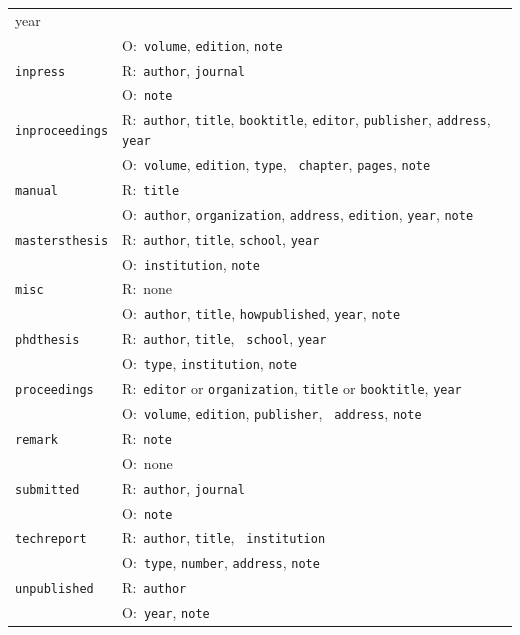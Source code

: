 \documentclass{article}
\begin{document}
\begin{tabular}{|ll|}
{year} \\ 
& \textsf{O:}~\texttt{volume}, \texttt{edition}, \texttt{note} \\ \hline
\texttt{inpress} & \textsf{R:}~\texttt{author}, \texttt{journal} \\ 
& \textsf{O:}~\texttt{note} \\ \hline
\texttt{inproceedings} & \textsf{R:}~\texttt{author}, \texttt{title}, 
\texttt{booktitle}, \texttt{editor}, \texttt{publisher}, \texttt{address}, 
\texttt{year} \\ 
& \textsf{O:}~\texttt{volume}, \texttt{edition}, \texttt{type}, \texttt{%
chapter}, \texttt{pages}, \texttt{note} \\ \hline
\texttt{manual} & \textsf{R:}~\texttt{title} \\ 
& \textsf{O:}~\texttt{author}, \texttt{organization}, \texttt{address}, 
\texttt{edition}, \texttt{year}, \texttt{note} \\ \hline
\texttt{mastersthesis} & \textsf{R:}~\texttt{author}, \texttt{title}, 
\texttt{school}, \texttt{year} \\ 
& \textsf{O:}~\texttt{institution}, \texttt{note} \\ \hline
\texttt{misc} & \textsf{R:}~none \\ 
& \textsf{O:}~\texttt{author}, \texttt{title}, \texttt{howpublished}, 
\texttt{year}, \texttt{note} \\ \hline
\texttt{phdthesis} & \textsf{R:}~\texttt{author}, \texttt{title}, \texttt{%
school}, \texttt{year} \\ 
& \textsf{O:}~\texttt{type}, \texttt{institution}, \texttt{note} \\ \hline
\texttt{proceedings} & \textsf{R:}~\texttt{editor} or \texttt{organization}, 
\texttt{title} or \texttt{booktitle}, \texttt{year} \\ 
& \textsf{O:}~\texttt{volume}, \texttt{edition}, \texttt{publisher}, \texttt{%
address}, \texttt{note} \\ \hline
\texttt{remark} & \textsf{R:}~\texttt{note} \\ 
& \textsf{O:}~none \\ \hline
\texttt{submitted} & \textsf{R:}~\texttt{author}, \texttt{journal} \\ 
& \textsf{O:}~\texttt{note} \\ \hline
\texttt{techreport} & \textsf{R:}~\texttt{author}, \texttt{title}, \texttt{%
institution} \\ 
& \textsf{O:}~\texttt{type}, \texttt{number}, \texttt{address}, \texttt{note}
\\ \hline
\texttt{unpublished} & \textsf{R:}~\texttt{author } \\ 
& \textsf{O:}~\texttt{year}, \texttt{note} \\ \hline
\end{tabular}
\end{document}
